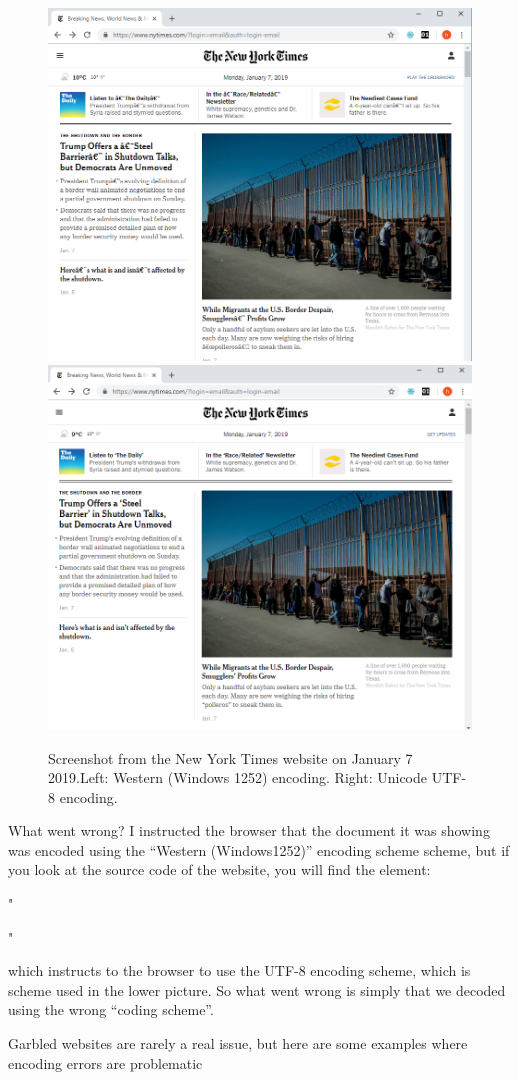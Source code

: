 \documentclass[]{book}
\begin{document}
\begin{figure}

{\centering \includegraphics[width=0.5\linewidth]{_resources/chapter_storing/nytimes_western_encoding} \includegraphics[width=0.5\linewidth]{_resources/chapter_storing/nytimes_utf8_encoding} 

}

\caption{Screenshot from the New York Times website on January 7 2019.Left: Western (Windows 1252) encoding. Right: Unicode UTF-8 encoding.}\label{fig:store3}
\end{figure}

What went wrong? I instructed the browser that the document it was showing was encoded using the ``Western (Windows1252)'' encoding scheme scheme, but if you look at the source code of the website, you will find the element:

"

"

which instructs to the browser to use the UTF-8 encoding scheme, which is scheme used in the lower picture. So what went wrong is simply that we decoded using the wrong ``coding scheme''.

Garbled websites are rarely a real issue, but here are some examples where encoding errors are problematic
\end{document}
